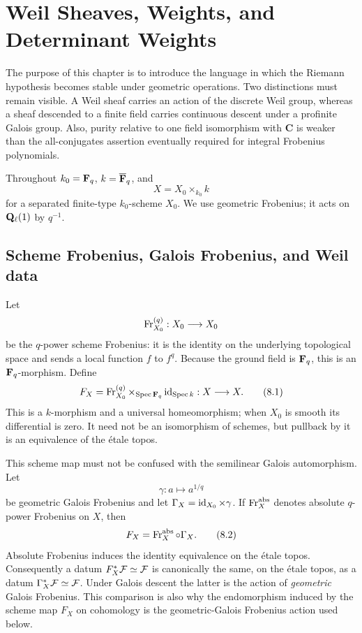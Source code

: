 \chapter{Weil Sheaves, Weights, and Determinant Weights}
\label{chap:weights}

The purpose of this chapter is to introduce the language in which the
Riemann hypothesis becomes stable under geometric operations.  Two
distinctions must remain visible.  A Weil sheaf carries an action of the
discrete Weil group, whereas a sheaf descended to a finite field carries
continuous descent under a profinite Galois group.  Also, purity relative
to one field isomorphism with \(\mathbf C\) is weaker than the
all-conjugates assertion eventually required for integral Frobenius
polynomials.

Throughout \(k_0=\mathbf F_q\), \(k=\overline{\mathbf F}_q\), and
\[
  X=X_0\times_{k_0}k
\]
for a separated finite-type \(k_0\)-scheme \(X_0\).  We use geometric
Frobenius; it acts on \(\mathbf Q_\ell(1)\) by \(q^{-1}\).

\section{Scheme Frobenius, Galois Frobenius, and Weil data}

Let
\[
  \operatorname{Fr}_{X_0}^{(q)}:X_0\longrightarrow X_0
\]
be the \(q\)-power scheme Frobenius: it is the identity on the
underlying topological space and sends a local function \(f\) to
\(f^q\).  Because the ground field is \(\mathbf F_q\), this is an
\(\mathbf F_q\)-morphism.  Define
\[
  F_X
  =
  \operatorname{Fr}_{X_0}^{(q)}\times_{\operatorname{Spec}\mathbf F_q}\operatorname{id}_{\operatorname{Spec} k}
  :X\longrightarrow X.
\tag{8.1}\label{eq:scheme-frobenius}
\]
This is a \(k\)-morphism and a universal homeomorphism; when \(X_0\) is
smooth its differential is zero.  It need not be an isomorphism of
schemes, but pullback by it is an equivalence of the \'etale topos.

This scheme map must not be confused with the semilinear Galois
automorphism.  Let
\[
  \gamma:a\longmapsto a^{1/q}
\]
be geometric Galois Frobenius and let
\(\Gamma_X=\operatorname{id}_{X_0}\times\gamma\).  If
\(\operatorname{Fr}_X^{\mathrm{abs}}\) denotes absolute \(q\)-power Frobenius on
\(X\), then
\[
  F_X=\operatorname{Fr}_X^{\mathrm{abs}}\circ\Gamma_X.
\tag{8.2}\label{eq:two-frobenius-comparison}
\]
Absolute Frobenius induces the identity equivalence on the \'etale
topos.  Consequently a datum
\(F_X^*\mathcal F\simeq\mathcal F\) is canonically the same, on the \'etale topos, as
a datum \(\Gamma_X^*\mathcal F\simeq\mathcal F\).  Under Galois descent the latter is
the action of \emph{geometric} Galois Frobenius.  This comparison is
also why the endomorphism induced by the scheme map \(F_X\) on
cohomology is the geometric-Galois Frobenius action used below.

